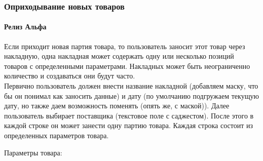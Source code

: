 \documentclass[DIV=calc, paper=a4, fontsize=11pt]{scrartcl} %
\begin{document}
\subsubsection{Оприходывание новых товаров}

\paragraph{Релиз Альфа}
Если приходит новая партия товара, то пользователь заносит этот товар через накладную, одна накладная может содержать одну или несколько позиций товаров с определенными параметрами. Накладных может быть неограниченно количество и создаваться они будут часто.
\\[0.5cm]
Первично пользователь должен внести название накладной (добавляем маску, что бы он понимал как заносить данные) и дату (по умолчанию подгружаем текущую дату, но также даем возможность поменять (опять же, с маской)). Далее пользователь выбирает поставщика (текстовое поле с саджестом). После этого в каждой строке он может занести одну партию товара. Каждая строка состоит из определенных параметров товара.

Параметры товара:
\end{document}

